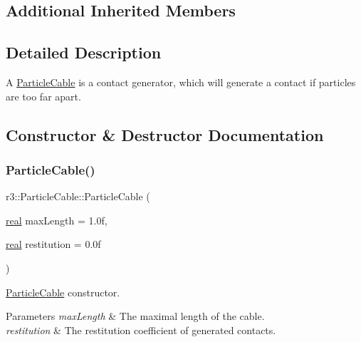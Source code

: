 \subsection*{Additional Inherited Members}


\subsection{Detailed Description}
A \mbox{\hyperlink{classr3_1_1_particle_cable}{Particle\+Cable}} is a contact generator, which will generate a contact if particles are too far apart. 

\subsection{Constructor \& Destructor Documentation}
\mbox{\label{classr3_1_1_particle_cable_afcb568750f7430ec94e34942f766e087}} 
\subsubsection{\texorpdfstring{Particle\+Cable()}{ParticleCable()}}
{\footnotesize\ttfamily r3\+::\+Particle\+Cable\+::\+Particle\+Cable (\begin{DoxyParamCaption}\item[{\mbox{\hyperlink{namespacer3_ab2016b3e3f743fb735afce242f0dc1eb}{real}}}]{max\+Length = {\ttfamily 1.0f},  }\item[{\mbox{\hyperlink{namespacer3_ab2016b3e3f743fb735afce242f0dc1eb}{real}}}]{restitution = {\ttfamily 0.0f} }\end{DoxyParamCaption})\hspace{0.3cm}{\ttfamily [explicit]}}



\mbox{\hyperlink{classr3_1_1_particle_cable}{Particle\+Cable}} constructor. 


\begin{DoxyParams}{Parameters}
{\em max\+Length} & The maximal length of the cable. \\
\hline
{\em restitution} & The restitution coefficient of generated contacts. \\
\hline
\end{DoxyParams}
\mbox{\label{classr3_1_1_particle_cable_a4ba107749641635a5d7b670eab78c371}} 
